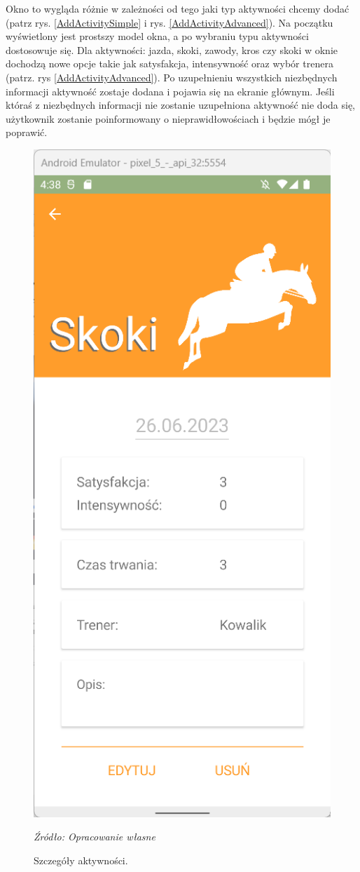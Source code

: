 \documentclass[12pt,twoside]{report}
\begin{document}
Okno to wygląda różnie w zależności od tego jaki typ aktywności chcemy dodać (patrz rys. \ref{AddActivitySimple} i rys. \ref{AddActivityAdvanced}). Na początku wyświetlony jest prostszy model okna, a po wybraniu typu aktywności dostosowuje się. Dla aktywności: jazda, skoki, zawody, kros czy skoki w oknie dochodzą nowe opcje takie jak satysfakcja, intensywność oraz wybór trenera (patrz. rys \ref{AddActivityAdvanced}). Po uzupełnieniu wszystkich niezbędnych informacji aktywność zostaje dodana i pojawia się na ekranie głównym. Jeśli któraś z niezbędnych informacji nie zostanie uzupełniona aktywność nie doda się, użytkownik zostanie poinformowany o nieprawidłowościach i będzie mógł je poprawić.
\begin{figure}
	\centering
	\includegraphics[scale=0.7]{ActivityDetailsView}
	\caption{\centering Szczegóły aktywności.}
	\textit{Źródło: Opracowanie własne}
	\label{ActivityDetails}
\end{figure}
\end{document}
